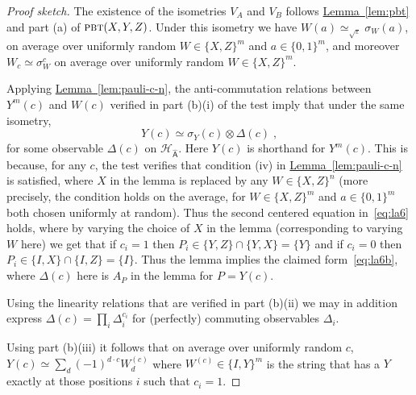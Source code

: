 \documentclass[11pt]{article}
\numberwithin{equation}{section}
\theoremstyle{definition}
\theoremstyle{plain}
\newcommand{\expref}[2]{\hyperref[#2]{#1~\ref{#2}}}
\newcommand{\reg}[1]{{\textsf{#1}}}
\newcommand{\mH}{\mathcal{H}}
\newcommand{\eps}{\varepsilon}
\newcommand{\pbt}{\textsc{pbt}}
\begin{document}
\begin{proof}[Proof sketch]
The existence of the isometries $V_A$ and $V_B$ follows \expref{Lemma}{lem:pbt} and part (a) of $\pbt(X,Y,Z)$. 
 Under this isometry we have $W(a) \simeq_{\sqrt{\eps}} \sigma_W(a)$, on average over uniformly random $W\in\{X,Z\}^m$ and $a\in\{0,1\}^m$, and moreover $W_c \simeq \sigma_W^c$ on average over uniformly random $W\in\{X,Z\}^m$. 

Applying \expref{Lemma}{lem:pauli-c-n}, the anti-commutation relations between $Y^m(c)$ and $W(c)$ verified in part (b)(i) of the test imply that under the same isometry,
\begin{equation}\label{eq:la6b}
 Y(c) \simeq \sigma_Y(c) \otimes {\Delta}(c)\;,
\end{equation}
for some observable ${\Delta}(c)$ on ${\mH}_{\hat{\reg{A}}}$. Here $Y(c)$ is shorthand for $Y^m(c)$. This is because, for any $c$, the test verifies that condition (iv) in \expref{Lemma}{lem:pauli-c-n} is satisfied, where $X$ in the lemma is replaced by any $W\in\{X,Z\}^n$ (more precisely, the condition holds on the average, for $W\in\{X,Z\}^m$ and $a\in\{0,1\}^m$ both chosen uniformly at random). Thus the second centered equation in~\eqref{eq:la6} holds, where by varying the choice of $X$ in the lemma (corresponding to varying $W$ here) we get that if $c_i=1$ then $P_i\in \{Y,Z\}\cap \{Y,X\}=\{Y\}$ and if $c_i=0$ then $P_i\in \{I,X\}\cap\{I,Z\}=\{I\}$. Thus the lemma implies the claimed form~\eqref{eq:la6b}, where $\Delta(c)$ here is $A_P$ in the lemma for $P=Y(c)$. 

Using the linearity relations that are verified in part (b)(ii) we may in addition express $\Delta(c) = \prod_i \Delta_{i}^{c_i}$ for (perfectly) commuting observables $\Delta_i$. 





Using part (b)(iii) it follows that on average over uniformly random $c$, $Y(c)\simeq \sum_d  (-1)^{d\cdot c} W^{(c)}_d$ where $W^{(c)} \in \{I,Y\}^m$ is the string that has a $Y$ exactly at those positions $i$ such that $c_i=1$. 



\end{proof}
\end{document}
